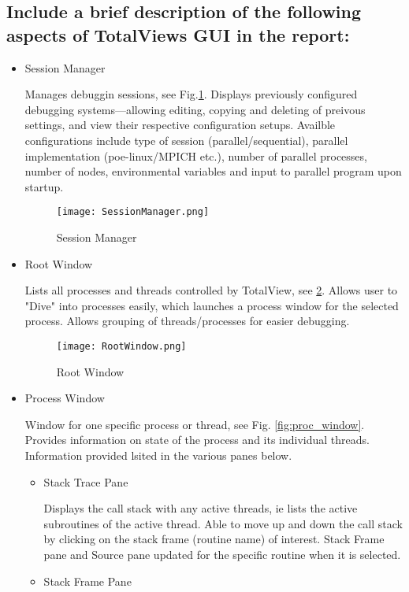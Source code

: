 \documentclass{article}
\begin{document}
\subsection{Include a brief description of the following aspects of TotalViews GUI in the report:}
\begin{itemize}
	\item Session Manager
	
	Manages debuggin sessions, see Fig.\ref{fig:sess_manager}. Displays previously configured debugging systems---allowing editing, copying and deleting of preivous settings, and view their respective configuration setups. Availble configurations include type of session (parallel/sequential), parallel implementation (poe-linux/MPICH etc.), number of parallel processes, number of nodes, environmental variables and input to parallel program upon startup.
	\begin{figure}[p] %
			\texttt{[image: SessionManager.png]}
		\caption{Session Manager}
		\label{fig:sess_manager}
	\end{figure}
	\item Root Window
	
	Lists all processes and threads controlled by TotalView, see \ref{fig:root_window}. Allows user to "Dive" into processes easily, which launches a process window for the selected process. Allows grouping of threads/processes for easier debugging.
		\begin{figure}[p] %
			\texttt{[image: RootWindow.png]}
		\caption{Root Window}
		\label{fig:root_window}
	\end{figure}
	\item Process Window
	
	Window for one specific process or thread, see Fig. \ref{fig:proc_window}. Provides information on state of the process and its individual threads. Information provided lsited in the various panes below.
	\begin{itemize}
		\item Stack Trace Pane
		
		Displays the call stack with any active threads, ie lists the active subroutines of the active thread. Able to move up and down the call stack by clicking on the stack frame (routine name) of interest. Stack Frame pane and Source pane updated for the specific routine when it is selected.
		\item Stack Frame Pane
		

\end{itemize}
\end{itemize}
\end{document}
